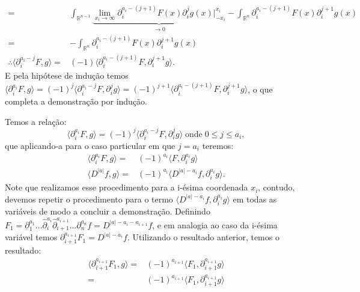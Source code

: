 \documentclass{article}
\begin{document}
\begin{enumerate}
$$\begin{aligned}
		\\
		= & \int_{\mathbb{R}^{n-1}} \underbrace{ \lim_{x_{i} \to \infty} \partial^{a_{i}-(j+1)}_{i}F(x)\partial^{j}_{i}g(x) \Big|^{x_{i}}_{-x_{i}} }_{\to 0} -  \int_{\mathbb{R}^{n}} \partial^{a_{i}-(j+1)}_{i}F(x) \partial^{j+1}_{i}g(x)
		\\
		= & - \int_{\mathbb{R}^{n}} \partial^{a_{i}-(j+1)}_{i}F(x) \partial^{j+1}_{i}g(x)
		\\
		\therefore \langle \partial^{a_{i}-j}_{i}F, g \rangle = & (-1)\langle \partial^{a_{i}-(j+1)}_{i}F, \partial^{j+1}_{i}g \rangle.
		\end{aligned}
		$$
		E pela hipótese de indução temos $\langle \partial^{a_{i}}_{i}F, g \rangle = (-1)^{j} \langle \partial^{a_{i}-j}_{i}F, \partial^{j}_{i}g \rangle = (-1)^{j+1}\langle \partial^{a_{i}-(j+1)}_{i}F, \partial^{j+1}_{i}g \rangle$, o que completa a demonstração por indução.
		
		Temos a relação:
		$$
		\langle \partial^{a_{i}}_{i}F, g \rangle = (-1)^{j}\langle \partial^{a_{i}-j}_{i}F, \partial^{j}_{i}g \rangle \; \text{onde} \; 0 \leq j \leq a_{i},
		$$
		que aplicando-a para o caso particular em que $j = a_{i}$ teremos: 
		$$
		\begin{aligned}
		\langle \partial^{a_{i}}_{i}F, g \rangle = & (-1)^{a_{i}}\langle F, \partial^{a_{i}}_{i}g \rangle
		\\
		\langle D^{|a|}f, g \rangle = & (-1)^{a_{i}}\langle  D^{|a|-a_{i}}f, \partial^{a_{i}}_{i}g \rangle.
		\end{aligned}
		$$
		Note que realizamos esse procedimento para a i-ésima coordenada $x_{i}$, contudo, devemos repetir o procedimento para o termo  $\langle  D^{|a|-a_{i}}f, \partial^{a_{i}}_{i}g \rangle$ em todas as variáveis de modo a concluir a demonstração. Definindo $F_{1} = \partial^{a_{1}}_{1}...\hat{\partial}^{a_{i}}_{i} \hat{\partial}^{a_{i+1}}_{i+1}...\partial^{a_{n}}_{n}f = D^{|a|-a_{i}-a_{i+1}}f$, e em analogia ao caso da i-ésima variável temos $\partial^{a_{i+1}}_{i+1}F_{1} = D^{|a|-a_{i}}f$. Utilizando o resultado anterior, temos o resultado: 
		$$
		\begin{aligned}
		\langle \partial^{a_{i+1}}_{i+1}F_{1}, g \rangle = & (-1)^{a_{i+1}}\langle F_{1}, \partial^{a_{i+1}}_{i+1}g \rangle
		\\
		= & (-1)^{a_{i+1}}\langle F_{1}, \partial^{a_{i+1}}_{i+1}g \rangle
		\end{aligned}$$
		

\end{enumerate}
\end{document}
